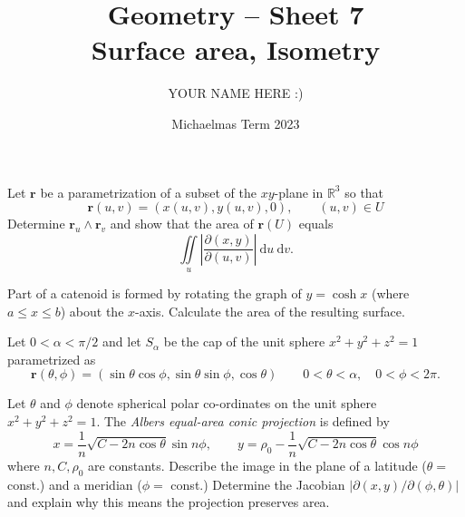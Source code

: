 \documentclass[answers]{exam}
\title{Geometry -- Sheet 7\\Surface area, Isometry}
\author{YOUR NAME HERE :)}
\date{Michaelmas Term 2023}
\begin{document}
\maketitle
\begin{questions}

\question%
Let $\mathbf{r}$ be a parametrization of a subset of the $x y$-plane in $\mathbb{R}^{3}$ so that \[
	\mathbf{r}(u, v)=(x(u, v), y(u, v), 0), \qquad(u, v) \in U
\] Determine $\mathbf{r}_{u} \wedge \mathbf{r}_{v}$ and show that the area of $\mathbf{r}(U)$ equals \[
	\iint\limits_u\left|\frac{\partial(x, y)}{\partial(u, v)}\right|~\mathrm du~\mathrm dv.
\]



\question%
Part of a catenoid is formed by rotating the graph of $y=\cosh x$ (where $a \leqslant x \leqslant b$) about the $x$-axis. Calculate the area of the resulting surface.



\question%
Let $0<\alpha<\pi / 2$ and let $S_{\alpha}$ be the cap of the unit sphere $x^{2}+y^{2}+z^{2}=1$ parametrized as \[
	\mathbf r(\theta, \phi)=(\sin\theta\cos\phi, \sin\theta\sin\phi, \cos\theta)\qquad
	0<\theta<\alpha,\quad 0<\phi<2\pi.
\]



\question%
Let $\theta$ and $\phi$ denote spherical polar co-ordinates on the unit sphere $x^{2}+y^{2}+z^{2}=1$. The \emph{Albers equal-area conic projection} is defined by \[
	x=\frac1n\sqrt{C-2n\cos\theta}\sin n\phi,\qquad
	y=\rho_0-\frac1n\sqrt{C-2n\cos\theta}\cos n\phi
\] where $n, C, \rho_{0}$ are constants. Describe the image in the plane of a latitude ($\theta=$ const.) and a meridian ($\phi=$ const.) Determine the Jacobian $|\partial(x, y) / \partial(\phi, \theta)|$ and explain why this means the projection preserves area.




\end{questions}
\end{document}
